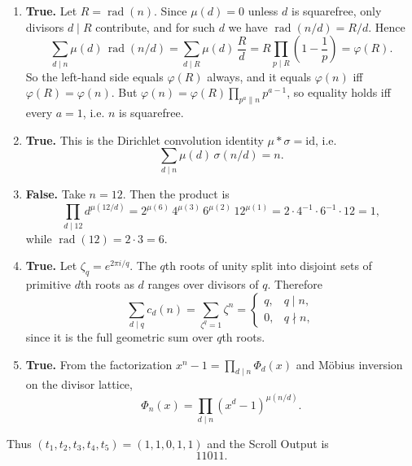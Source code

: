 \medskip


\SolutionPage

\begin{enumerate}[label=\textbf{\arabic*.},leftmargin=*]

\item \textbf{True.}
Let $R=\operatorname{rad}(n)$. Since $\mu(d)=0$ unless $d$ is squarefree, only divisors $d\mid R$ contribute, and for such $d$ we have $\operatorname{rad}(n/d)=R/d$. Hence
\[
\sum_{d\mid n}\mu(d)\,\operatorname{rad}(n/d)=\sum_{d\mid R}\mu(d)\,\frac{R}{d}
=R\prod_{p\mid R}\left(1-\frac1p\right)=\varphi(R).
\]
So the left-hand side equals $\varphi(R)$ always, and it equals $\varphi(n)$ iff $\varphi(R)=\varphi(n)$.
But $\varphi(n)=\varphi(R)\prod_{p^a\| n}p^{a-1}$, so equality holds iff every $a=1$, i.e. $n$ is squarefree.

\item \textbf{True.}
This is the Dirichlet convolution identity $\mu*\sigma=\mathrm{id}$, i.e.
\[
\sum_{d\mid n}\mu(d)\,\sigma(n/d)=n.
\]

\item \textbf{False.}
Take $n=12$. Then the product is
\[
\prod_{d\mid 12} d^{\mu(12/d)}
=2^{\mu(6)}\,4^{\mu(3)}\,6^{\mu(2)}\,12^{\mu(1)}
=2\cdot 4^{-1}\cdot 6^{-1}\cdot 12
=1,\]
while $\operatorname{rad}(12)=2\cdot 3=6$.

\item \textbf{True.}
Let $\zeta_q=e^{2\pi i/q}$. The $q$th roots of unity split into disjoint sets of primitive $d$th roots as $d$ ranges over divisors of $q$.
Therefore
\[
\sum_{d\mid q} c_d(n)
=\sum_{\zeta^q=1} \zeta^n
=\begin{cases}q,& q\mid n,\\ 0,& q\nmid n,\end{cases}
\]
since it is the full geometric sum over $q$th roots.

\item \textbf{True.}
From the factorization $x^n-1=\prod_{d\mid n}\Phi_d(x)$ and Möbius inversion on the divisor lattice,
\[
\Phi_n(x)=\prod_{d\mid n}(x^d-1)^{\mu(n/d)}.
\]
\end{enumerate}

Thus $(t_1,t_2,t_3,t_4,t_5)=(1,1,0,1,1)$ and the Scroll Output is
\[
\boxed{11011}.
\]


\NextPage
